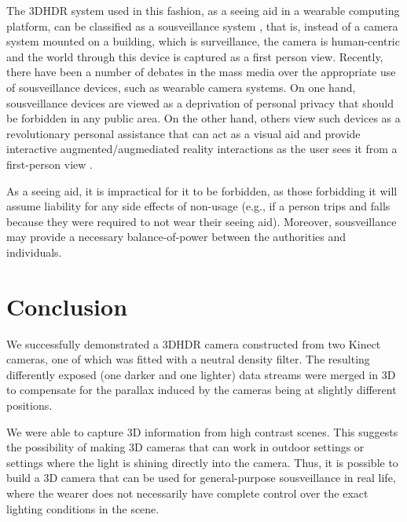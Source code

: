 The 3DHDR system used in this fashion, as a seeing aid in a wearable computing platform, can be classified as a sousveillance system \cite{mann2004sousveillance,mann2006cyborglogging,mann2002sousveillance}, that is, instead of a camera system mounted on a building, which is surveillance, the camera is
human-centric and the world through this device is captured as a first person
view. Recently, there have been
a number of debates in the mass media over the appropriate use of sousveillance
devices, such as wearable camera systems. On one hand, sousveillance devices are viewed as
a deprivation of personal privacy that should be forbidden in any public area.
On the other hand, others view such devices as a revolutionary personal
assistance that can act as a visual aid and provide interactive
augmented/augmediated reality interactions \cite{hill2004reality} as the user sees it from a first-person view \cite{aimone2003eyetap}.

As a seeing aid, it is impractical for it to be forbidden, as those forbidding
it will assume liability for any side effects of non-usage (e.g., if a person
trips and falls because they were required to not wear their seeing aid).
Moreover, sousveillance may provide a necessary
balance-of-power between the authorities and individuals.

\section{Conclusion}
We successfully demonstrated a 3DHDR camera constructed from two
Kinect cameras, one of which was fitted with a neutral density filter.
The resulting differently exposed (one darker and one lighter) data streams
were merged in 3D to compensate for the parallax induced by the cameras
being at slightly different positions.

We were able to capture 3D information from high contrast scenes.
This suggests the possibility of making 3D cameras that can work in
outdoor settings or settings where the light is shining directly into
the camera. Thus, it is possible to build a 3D camera that can be used for
general-purpose sousveillance in real life, where the wearer does not
necessarily have complete control over the exact lighting conditions in the scene.

